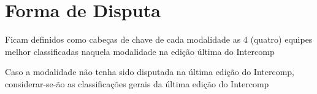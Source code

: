 {\let\clearpage\relax \chapter{Forma de Disputa}}

\begin{article}
	\label{art:cabecas}
	Ficam definidos como cabeças de chave de cada modalidade as 4 (quatro) equipes melhor classificadas naquela modalidade na edição última do Intercomp

	\begin{xparagraph}
		Caso a modalidade não tenha sido disputada na última edição do Intercomp, considerar-se-ão as classificações gerais da última edição do Intercomp
	\end{xparagraph}
\end{article}


